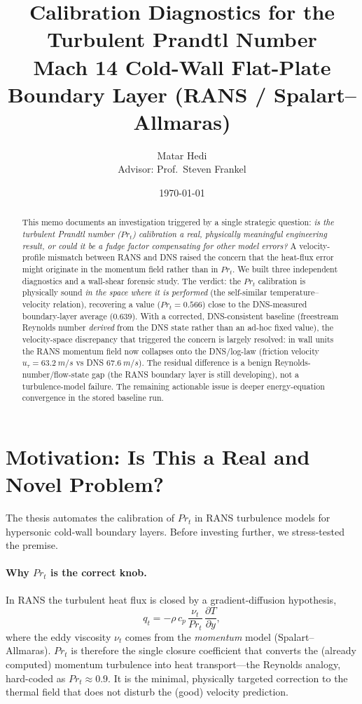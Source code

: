 \documentclass[11pt]{article}
\title{\textbf{Calibration Diagnostics for the Turbulent Prandtl Number}\\[2pt]
\large Mach 14 Cold-Wall Flat-Plate Boundary Layer (RANS / Spalart--Allmaras)}
\author{Matar Hedi \\ \small Advisor: Prof.\ Steven Frankel}
\date{\today}
\newcommand{\Prt}{\ensuremath{Pr_t}}
\newcommand{\utau}{\ensuremath{u_\tau}}
\begin{document}
\maketitle

\begin{abstract}
\noindent
This memo documents an investigation triggered by a single strategic question:
\emph{is the turbulent Prandtl number (\Prt) calibration a real, physically meaningful
engineering result, or could it be a fudge factor compensating for other model
errors?} A velocity-profile mismatch between RANS and DNS raised the concern that the
heat-flux error might originate in the momentum field rather than in \Prt.
We built three independent diagnostics and a wall-shear forensic study. The verdict:
the \Prt{} calibration is physically sound \emph{in the space where it is performed}
(the self-similar temperature--velocity relation), recovering a value
($\Prt = 0.566$) close to the DNS-measured boundary-layer average ($0.639$). With a
corrected, DNS-consistent baseline (freestream Reynolds number \emph{derived} from the
DNS state rather than an ad-hoc fixed value), the velocity-space discrepancy that
triggered the concern is largely resolved: in wall units the RANS momentum field now
collapses onto the DNS/log-law (friction velocity $\utau = \SI{63.2}{m/s}$ vs DNS
$\SI{67.6}{m/s}$). The residual difference is a benign Reynolds-number/flow-state gap
(the RANS boundary layer is still developing), not a turbulence-model failure. The
remaining actionable issue is deeper energy-equation convergence in the stored baseline
run.
\end{abstract}

\section{Motivation: Is This a Real and Novel Problem?}
The thesis automates the calibration of \Prt{} in RANS turbulence models for hypersonic
cold-wall boundary layers. Before investing further, we stress-tested the premise.

\paragraph{Why \Prt{} is the correct knob.}
In RANS the turbulent heat flux is closed by a gradient-diffusion hypothesis,
\begin{equation}
q_t = -\rho\, c_p\, \frac{\nu_t}{\Prt}\,\frac{\partial T}{\partial y},
\end{equation}
where the eddy viscosity $\nu_t$ comes from the \emph{momentum} model (Spalart--Allmaras).
\Prt{} is therefore the single closure coefficient that converts the (already computed)
momentum turbulence into heat transport---the Reynolds analogy, hard-coded as
$\Prt \approx 0.9$. It is the minimal, physically targeted correction to the thermal
field that does not disturb the (good) velocity prediction.
\end{document}
